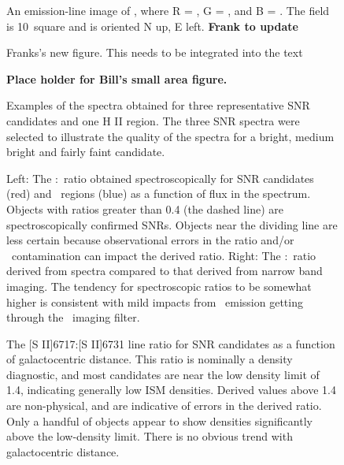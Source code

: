 \begin{figure}
\caption{An emission-line image of \gal, where R = \ha, G = \sii, and B = \oiii.  The field is 10\arcmin\ square and is oriented N up, E left.  {\bf Frank to update} }
\end{figure}

\begin{figure}
\caption{Franks's new figure. This needs to be integrated into the text \label{fig_overview}}
\end{figure}

\begin{figure}
\caption{\bf Place holder for Bill's small area figure. \label{fig_example_image}}
\end{figure}

\begin{figure}
\caption{Examples of the spectra obtained for three representative SNR candidates and one H II region.  The three SNR spectra were selected to illustrate the quality of the spectra for a bright, medium bright and fairly faint candidate.  \label{fig_example_spectra}}
\end{figure}

\begin{figure}
\caption{Left: The \sii:\ha\ ratio obtained spectroscopically for SNR candidates (red) and \hii\ regions (blue) as a function of \ha flux in the spectrum.  Objects with ratios greater than 0.4 (the dashed line) are spectroscopically confirmed SNRs.  Objects near the dividing line are less certain because observational errors in the ratio and/or \hii\ contamination can impact the derived ratio. Right: The \sii:\ha\ ratio derived from spectra compared to that derived from narrow band imaging.  The tendency for spectroscopic ratios to be somewhat higher is consistent with mild impacts from \nii\ emission getting through the \ha\ imaging filter.  \label{fig_s2_ha}}

\end{figure}

\begin{figure}
\caption{The [S II]6717:[S II]6731 line ratio for SNR candidates as a function of galactocentric distance.  This ratio is nominally a density diagnostic, and most candidates are near the low density limit of 1.4, indicating generally low ISM densities. Derived values above 1.4 are non-physical, and are indicative of errors in the derived ratio.  Only a handful of objects appear to show densities significantly above the low-density limit.  There is no obvious trend with galactocentric distance.  \label{fig_s2_ratio}}
\end{figure}

